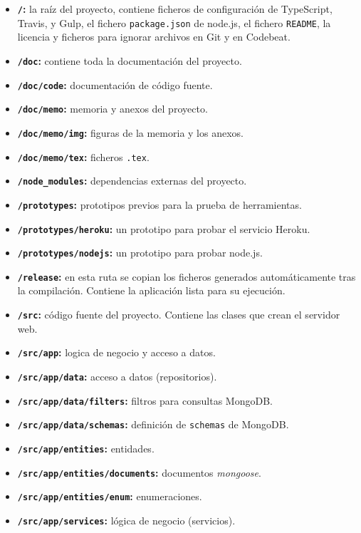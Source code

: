 \begin{itemize}
	\item \textbf{\texttt{/}:} la raíz del proyecto, contiene ficheros de configuración de TypeScript, Travis, y Gulp, el fichero \texttt{package.json} de node.js, el fichero \texttt{README}, la licencia y ficheros para ignorar archivos en Git y en Codebeat.
	\item \textbf{\texttt{/doc}:} contiene toda la documentación del proyecto.
	\item \textbf{\texttt{/doc/code}:} documentación de código fuente.
	\item \textbf{\texttt{/doc/memo}:} memoria y anexos del proyecto.
	\item \textbf{\texttt{/doc/memo/img}:} figuras de la memoria y los anexos.
	\item \textbf{\texttt{/doc/memo/tex}:} ficheros \texttt{.tex}.
	\item \textbf{\texttt{/node\_modules}:} dependencias externas del proyecto.
	\item \textbf{\texttt{/prototypes}:} prototipos previos para la prueba de herramientas.
	\item \textbf{\texttt{/prototypes/heroku}:} un prototipo para probar el servicio Heroku.
	\item \textbf{\texttt{/prototypes/nodejs}:} un prototipo para probar node.js.
	\item \textbf{\texttt{/release}:} en esta ruta se copian los ficheros generados automáticamente tras la compilación. Contiene la aplicación lista para su ejecución.
	\item \textbf{\texttt{/src}:} código fuente del proyecto. Contiene las clases que crean el servidor web.
	\item \textbf{\texttt{/src/app}:} logica de negocio y acceso a datos.
	\item \textbf{\texttt{/src/app/data}:} acceso a datos (repositorios).
	\item \textbf{\texttt{/src/app/data/filters}:} filtros para consultas MongoDB.
	\item \textbf{\texttt{/src/app/data/schemas}:} definición de \texttt{schemas} de MongoDB.
	\item \textbf{\texttt{/src/app/entities}:} entidades.
	\item \textbf{\texttt{/src/app/entities/documents}:} documentos \textit{mongoose}.
	\item \textbf{\texttt{/src/app/entities/enum}:} enumeraciones.
	\item \textbf{\texttt{/src/app/services}:} lógica de negocio (servicios).

\end{itemize}

